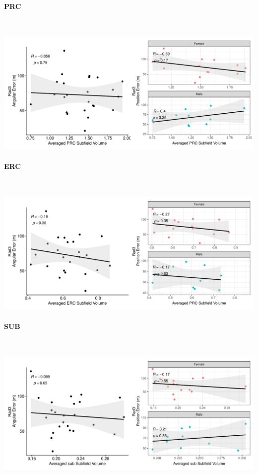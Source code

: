 \documentclass[
]{article}
\begin{document}
\paragraph{PRC}

~ \vspace{1cm}

\includegraphics{hippocampal_subfield_files/figure-latex/unnamed-chunk-12-1.pdf}

\newpage
\paragraph{ERC}

~ \vspace{1cm}

\includegraphics{hippocampal_subfield_files/figure-latex/unnamed-chunk-13-1.pdf}

\paragraph{SUB}

~ \vspace{1cm}

\includegraphics{hippocampal_subfield_files/figure-latex/unnamed-chunk-14-1.pdf}
\end{document}
